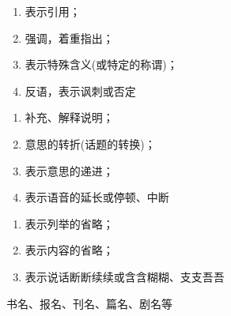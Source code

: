 \begin{enumerate}
\item 表示引用；
\item 强调，着重指出；
\item 表示特殊含义(或特定的称谓)；
\item 反语，表示讽刺或否定
\end{enumerate}
\begin{enumerate}
\item 补充、解释说明；
\item 意思的转折(话题的转换)；
\item 表示意思的递进；
\item 表示语音的延长或停顿、中断
\end{enumerate}
\begin{enumerate}
\item 表示列举的省略；
\item 表示内容的省略；
\item 表示说话断断续续或含含糊糊、支支吾吾
\end{enumerate}
  书名、报名、刊名、篇名、剧名等
